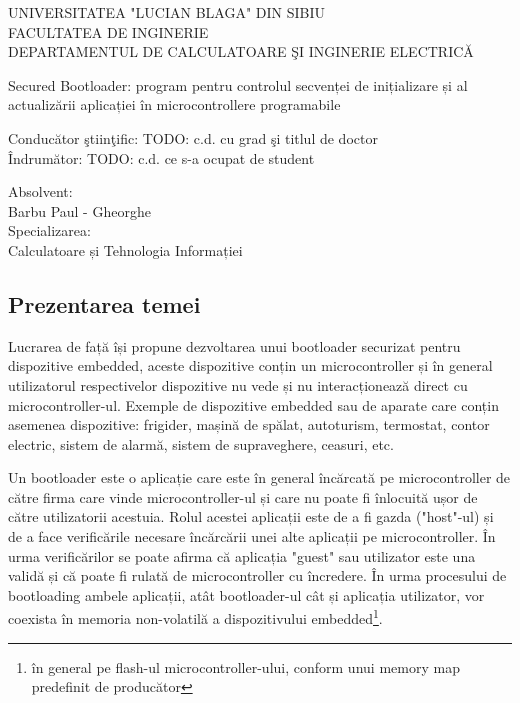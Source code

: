 \documentclass[12pt,a4paper,titlepage]{report}
\author{Barbu Paul - Gheorghe}
\begin{document}
\begin{titlepage}
{
\centering
UNIVERSITATEA "LUCIAN BLAGA" DIN SIBIU\\
FACULTATEA DE INGINERIE \\
DEPARTAMENTUL DE CALCULATOARE ŞI INGINERIE ELECTRICĂ\\
}

\vfill

{
\centering
\Large
Secured Bootloader: program pentru controlul secvenței de
inițializare și al actualizării aplicației în microcontrollere
programabile
}

\vfill
{
\raggedright
Conducător ştiinţific: TODO: c.d. cu  grad şi titlul de doctor \\
Îndrumător: TODO: c.d. ce s-a ocupat de student
}
\vfill

{
\raggedright
\hspace*{160pt}Absolvent: \\
\hspace*{160pt}Barbu Paul - Gheorghe\\
\hspace*{160pt}Specializarea:\\
\hspace*{160pt}Calculatoare și Tehnologia Informației
}

\end{titlepage}

\tableofcontents
\newpage

\subsection*{Prezentarea temei}

Lucrarea de față își propune dezvoltarea unui bootloader securizat pentru dispozitive embedded, aceste dispozitive conțin un microcontroller și în general utilizatorul respectivelor dispozitive nu vede și nu interacționează direct cu microcontroller-ul. Exemple de dispozitive embedded sau de aparate care conțin asemenea dispozitive: frigider, mașină de spălat, autoturism, termostat, contor electric, sistem de alarmă, sistem de supraveghere, ceasuri, etc.

Un bootloader este o aplicație care este în general încărcată pe microcontroller de către firma care vinde microcontroller-ul și care nu poate fi înlocuită ușor de către utilizatorii acestuia.
Rolul acestei aplicații este de a fi gazda ("host"-ul) și de a face verificările necesare încărcării unei alte aplicații pe microcontroller. În urma verificărilor se poate afirma că aplicația "guest" sau utilizator este una validă și că poate fi rulată de microcontroller cu încredere.
În urma procesului de bootloading ambele aplicații, atât bootloader-ul cât și aplicația utilizator, vor coexista în
memoria non-volatilă a dispozitivului embedded\footnote{în general pe flash-ul microcontroller-ului, conform unui memory map predefinit de producător}.
 
\end{document}
